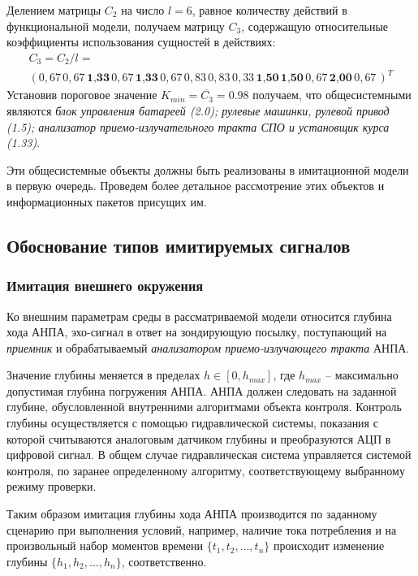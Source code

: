 Делением матрицы $C_2$ на число $l = 6$, равное количеству действий в функциональной модели, получаем матрицу $C_3$,
содержащую относительные коэффициенты использования сущностей в действиях:
\begin{multline}
    C_3 = C_2 / l = \\
        \left( 0,67\, 0,67\, \textbf{1,33}\, 0,67\, \textbf{1,33}\, 0,67\, 0,83\, 0,83\, 
        0,33\, \textbf{1,50}\,\textbf{1,50}\, 0,67\, \textbf{2,00}\, 0,67\, \right)^T
\end{multline}
Установив пороговое значение $K_{min} = \overline{C_3} = 0.98$ получаем, что общесистемными являются
\textit{блок управления батареей (2.0);
    рулевые машинки, рулевой привод (1.5);
    анализатор приемо-излучательного тракта СПО и установщик курса (1.33)}.

Эти общесистемные объекты должны быть реализованы в имитационной модели в первую очередь.
Проведем более детальное рассмотрение этих объектов и информационных пакетов присущих им.


\subsection{Обоснование типов имитируемых сигналов}\label{sec:model_anpa_params}

\subsubsection{Имитация внешнего окружения}\label{sec:model_anpa:outer_params}
Ко внешним параметрам среды в рассматриваемой модели относится
глубина хода АНПА, эхо-сигнал в ответ на зондирующую посылку,
поступающий на \textit{приемник} и обрабатываемый \textit{анализатором приемо-излучающего тракта} АНПА.

Значение глубины меняется в пределах $h \in [0, h_{max}]$, где $h_{max}$ -- максимально допустимая глубина погружения АНПА.
АНПА должен следовать на заданной глубине, обусловленной внутренними алгоритмами объекта контроля.
Контроль глубины осуществляется с помощью гидравлической системы,
показания с которой считываются аналоговым датчиком глубины и преобразуются АЦП в цифровой сигнал.
В общем случае гидравлическая система управляется системой контроля,
по заранее определенному алгоритму, соответствующему выбранному режиму проверки.

Таким образом имитация глубины хода АНПА производится по заданному сценарию
при выполнения условий, например, наличие тока потребления
и на произвольный набор моментов времени $\{t_1, t_2, \ldots, t_n\}$
происходит изменение глубины $\{h_1, h_2, \ldots, h_n\}$, соответственно.


